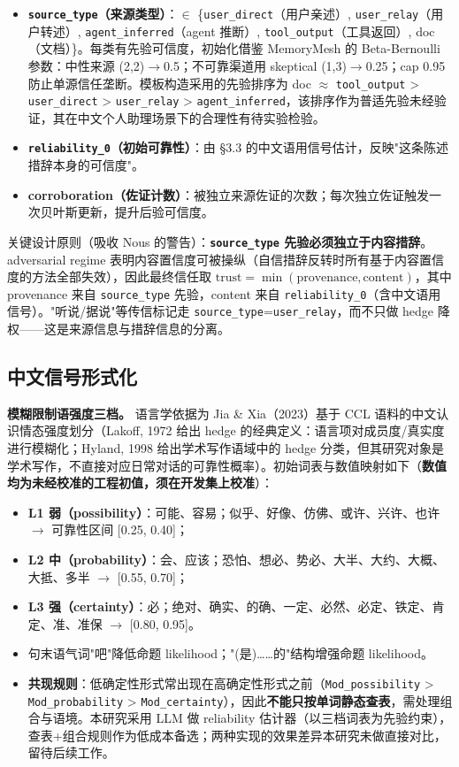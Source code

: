 \documentclass{article}
\begin{document}
\begin{itemize}
\item \textbf{\texttt{source\_type}（来源类型）}：$\in$ \{\texttt{user\_direct}（用户亲述）, \texttt{user\_relay}（用户转述）, \texttt{agent\_inferred}（agent 推断）, \texttt{tool\_output}（工具返回）, doc（文档）\}。每类有先验可信度，初始化借鉴 MemoryMesh 的 Beta-Bernoulli 参数：中性来源 (2,2)$\to$0.5；不可靠渠道用 skeptical (1,3)$\to$0.25；cap 0.95 防止单源信任垄断。模板构造采用的先验排序为 doc $\approx$ \texttt{tool\_output} > \texttt{user\_direct} > \texttt{user\_relay} > \texttt{agent\_inferred}，该排序作为普适先验未经验证，其在中文个人助理场景下的合理性有待实验检验。
\item \textbf{\texttt{reliability\_0}（初始可靠性）}：由 §3.3 的中文语用信号估计，反映"这条陈述措辞本身的可信度"。
\item \textbf{corroboration（佐证计数）}：被独立来源佐证的次数；每次独立佐证触发一次贝叶斯更新，提升后验可信度。
\end{itemize}

关键设计原则（吸收 Nous 的警告）：\textbf{\texttt{source\_type} 先验必须独立于内容措辞}。adversarial regime 表明内容置信度可被操纵（自信措辞反转时所有基于内容置信度的方法全部失效），因此最终信任取 $\mathrm{trust}=\min(\mathrm{provenance},\mathrm{content})$，其中 provenance 来自 \texttt{source\_type} 先验，content 来自 \texttt{reliability\_0}（含中文语用信号）。"听说/据说"等传信标记走 \texttt{source\_type}=\texttt{user\_relay}，而不只做 hedge 降权——这是来源信息与措辞信息的分离。


\subsection{中文信号形式化}

\textbf{模糊限制语强度三档。} 语言学依据为 Jia \& Xia（2023）基于 CCL 语料的中文认识情态强度划分（Lakoff, 1972 给出 hedge 的经典定义：语言项对成员度/真实度进行模糊化；Hyland, 1998 给出学术写作语域中的 hedge 分类，但其研究对象是学术写作，不直接对应日常对话的可靠性概率）。初始词表与数值映射如下（\textbf{数值均为未经校准的工程初值，须在开发集上校准}）：


\begin{itemize}
\item \textbf{L1 弱（possibility）}：可能、容易；似乎、好像、仿佛、或许、兴许、也许 $\to$ 可靠性区间 [0.25, 0.40]；
\item \textbf{L2 中（probability）}：会、应该；恐怕、想必、势必、大半、大约、大概、大抵、多半 $\to$ [0.55, 0.70]；
\item \textbf{L3 强（certainty）}：必；绝对、确实、的确、一定、必然、必定、铁定、肯定、准、准保 $\to$ [0.80, 0.95]。
\item 句末语气词"吧"降低命题 likelihood；"(是)……的"结构增强命题 likelihood。
\item \textbf{共现规则}：低确定性形式常出现在高确定性形式之前（\texttt{Mod\_possibility} > \texttt{Mod\_probability} > \texttt{Mod\_certainty}），因此\textbf{不能只按单词静态查表}，需处理组合与语境。本研究采用 LLM 做 reliability 估计器（以三档词表为先验约束），查表+组合规则作为低成本备选；两种实现的效果差异本研究未做直接对比，留待后续工作。
\end{itemize}
\end{document}
